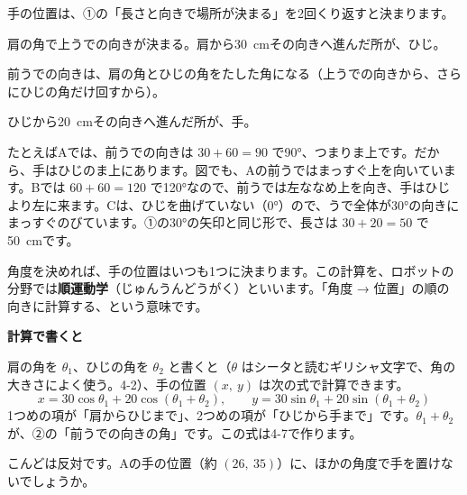 手の位置は、①の「長さと向きで場所が決まる」を2回くり返すと決まります。
\begin{enumerate}[label={\bkcircled[bkDeep]{\arabic*}}, leftmargin=2.4\zw, itemsep=2pt, topsep=2pt]
\item 肩の角で上うでの向きが決まる。肩から\qty{30}{cm}その向きへ進んだ所が、ひじ。
\item 前うでの向きは、肩の角とひじの角をたした角になる（上うでの向きから、さらにひじの角だけ回すから）。
\item ひじから\qty{20}{cm}その向きへ進んだ所が、手。
\end{enumerate}

たとえばAでは、前うでの向きは $30+60=90$ で90°、つまりま上です。だから、手はひじのま上にあります。図でも、Aの前うではまっすぐ上を向いています。Bでは $60+60=120$ で120°なので、前うでは左ななめ上を向き、手はひじより左に来ます。Cは、ひじを曲げていない（0°）ので、うで全体が30°の向きにまっすぐのびています。①の30°の矢印と同じ形で、長さは $30+20=50$ で\qty{50}{cm}です。

角度を決めれば、手の位置はいつも1つに決まります。この計算を、ロボットの分野では\textbf{順運動学}（じゅんうんどうがく）といいます。「角度 → 位置」の順の向きに計算する、という意味です。

\begin{seikaku}
\textbf{計算で書くと}\par
肩の角を $\theta_1$、ひじの角を $\theta_2$ と書くと（$\theta$ はシータと読むギリシャ文字で、角の大きさによく使う。4-2）、手の位置 $(x,\ y)$ は次の式で計算できます。\enspace\bkivakore
\[ x=30\cos\theta_1+20\cos(\theta_1+\theta_2),\qquad y=30\sin\theta_1+20\sin(\theta_1+\theta_2) \]
1つめの項が「肩からひじまで」、2つめの項が「ひじから手まで」です。$\theta_1+\theta_2$ が、②の「前うでの向きの角」です。この式は4-7で作ります。
\end{seikaku}


\label{bk:4-0:gyaku}こんどは反対です。Aの手の位置（約 $(26,\ 35)$）に、ほかの角度で手を置けないでしょうか。

